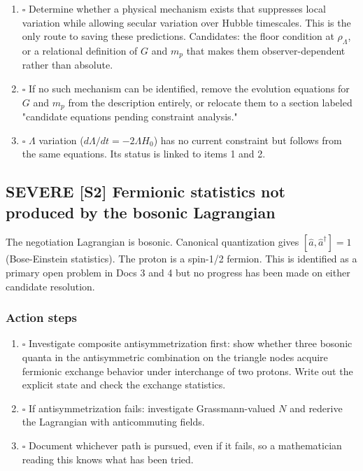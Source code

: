 \documentclass[11pt,letterpaper]{article}
\begin{document}
\begin{enumerate}
\item{$\square$} Determine whether a physical mechanism exists that suppresses local
variation while allowing secular variation over Hubble timescales. This is
the only route to saving these predictions. Candidates: the floor condition
at \(\rho_\Lambda\), or a relational definition of \(G\) and \(m_p\) that
makes them observer-dependent rather than absolute.
\item{$\square$} If no such mechanism can be identified, remove the evolution equations
for \(G\) and \(m_p\) from the description entirely, or relocate them to
a section labeled "candidate equations pending constraint analysis."
\item{$\square$} \(\Lambda\) variation (\(d\Lambda/dt = -2\Lambda H_0\)) has no current
constraint but follows from the same equations. Its status is linked to
items 1 and 2.
\end{enumerate}

\subsection{{\bfseries\sffamily SEVERE} [S2] Fermionic statistics not produced by the bosonic Lagrangian}
\label{sec:org76ca0ad}
The negotiation Lagrangian is bosonic. Canonical quantization gives
\([\hat{a}, \hat{a}^\dagger] = 1\) (Bose-Einstein statistics). The proton is
a spin-1/2 fermion. This is identified as a primary open problem in Docs 3 and 4
but no progress has been made on either candidate resolution.

\subsubsection{Action steps}
\label{sec:orgca05ab8}

\begin{enumerate}
\item{$\square$} Investigate composite antisymmetrization first: show whether three
bosonic quanta in the antisymmetric combination on the triangle nodes acquire
fermionic exchange behavior under interchange of two protons. Write out the
explicit state and check the exchange statistics.
\item{$\square$} If antisymmetrization fails: investigate Grassmann-valued \(N\) and
rederive the Lagrangian with anticommuting fields.
\item{$\square$} Document whichever path is pursued, even if it fails, so a mathematician
reading this knows what has been tried.
\end{enumerate}
\end{document}
